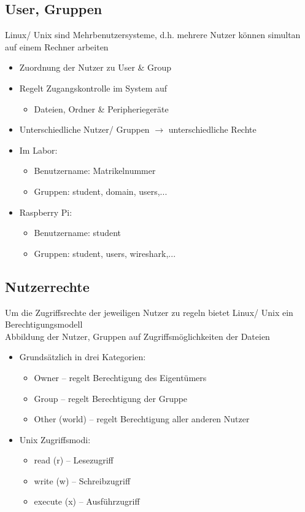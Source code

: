 \documentclass[xcolor=dvipsnames,aspectratio=169]{beamer}
\begin{document}
\subsection{User, Gruppen}
\begin{frame}
Linux/ Unix sind Mehrbenutzersysteme, d.h. mehrere Nutzer können simultan auf einem Rechner arbeiten
\begin{itemize}
	\item Zuordnung der Nutzer zu User \& Group
	\item Regelt Zugangskontrolle im System auf
	\begin{itemize}
	\item  Dateien, Ordner \& Peripheriegeräte
	\end{itemize}
	\item Unterschiedliche Nutzer/ Gruppen $\rightarrow$ unterschiedliche Rechte
	\item Im Labor:
	\begin{itemize}
		\item Benutzername: Matrikelnummer
		\item Gruppen: student, domain, users,...
	\end{itemize}
	\item Raspberry Pi:
	\begin{itemize}
		\item Benutzername: student
		\item Gruppen: student, users, wireshark,...
	\end{itemize}
\end{itemize}
\end{frame}

\subsection{Nutzerrechte}
\begin{frame}
Um die Zugriffsrechte der jeweiligen Nutzer zu regeln bietet Linux/ Unix ein Berechtigungsmodell\\
Abbildung der Nutzer, Gruppen auf Zugriffsmöglichkeiten der Dateien
\begin{itemize}
	\item Grundsätzlich in drei Kategorien:
	\begin{itemize}
		\item Owner -- regelt Berechtigung des Eigentümers
		\item Group -- regelt Berechtigung der Gruppe
		\item Other (world) -- regelt Berechtigung aller anderen Nutzer 
	\end{itemize}
	\item Unix Zugriffsmodi:
	\begin{itemize}
		\item read (r) -- Lesezugriff
		\item write (w) -- Schreibzugriff
		\item execute (x) -- Ausführzugriff
	\end{itemize}
\end{itemize}
\end{frame}
\end{document}
